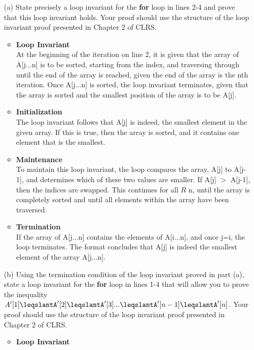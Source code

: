 \documentclass[12pt]{article}
\begin{document}
\begin{itemize}
    \item[(a)] State precisely a loop invariant for the \textbf{for} loop in lines 2-4 and prove that this loop invariant holds. Your proof should use the structure of the loop invariant proof presented in Chapter 2 of CLRS. \\
    \begin{itemize}
        \item \textbf{Loop Invariant} \\
        At the beginning of the iteration on line 2, it is given that the array of A[j...n] is to be sorted, starting from the index, and traversing through until the end of the array is reached, given the end of the array is the nth iteration. Once A[j...n] is sorted, the loop invariant terminates, given that the array is sorted and the smallest position of the array is to be A[j].
        \item \textbf{Initialization} \\
        The loop invariant follows that A[j] is indeed, the smallest element in the given array.  If this is true, then the array is sorted, and it contains one element that is the smallest. 
        \item \textbf{Maintenance} \\
	To maintain this loop invariant, the loop compares the array, A[j] to A[j-1], and determines which of these two values are smaller. If A[j] $>$ A[j-1], then the indices are swapped.  This continues for all $R$ n, until the array is completely sorted and until all elements within the array have been traversed. 
        \item \textbf{Termination} \\
If the array of A[j...n] contains the elements of A[i...n], and once j=i, the loop terminates. The format concludes that A[j] is indeed the smallest element of the array A[j...n].
    \end{itemize}
    \item[(b)]Using the termination condition of the loop invariant proved in part (a), state a loop invariant for the \textbf{for} loop in lines 1-4 that will allow you to prove the inequality $A'[1]\leqslantA'[2]\leqslantA'[3]...\leqslantA'[n-1]\leqslantA'[n]$. Your proof should use the structure of the loop invariant proof presented in Chapter 2 of CLRS. \\ 
    \begin{itemize}
        \item \textbf{Loop Invariant} \\

\end{itemize}
\end{itemize}
\end{document}
